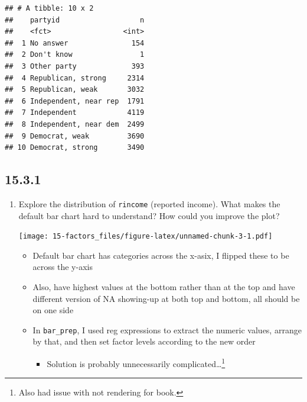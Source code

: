 \documentclass[]{book}
\newenvironment{Shaded}{\begin{snugshade}}{\end{snugshade}}
\newcommand{\DataTypeTok}[1]{\textcolor[rgb]{0.13,0.29,0.53}{#1}}
\newcommand{\KeywordTok}[1]{\textcolor[rgb]{0.13,0.29,0.53}{\textbf{#1}}}
\newcommand{\NormalTok}[1]{#1}
\newcommand{\OperatorTok}[1]{\textcolor[rgb]{0.81,0.36,0.00}{\textbf{#1}}}
\newcommand{\StringTok}[1]{\textcolor[rgb]{0.31,0.60,0.02}{#1}}
\providecommand{\tightlist}{%
  \setlength{\itemsep}{0pt}\setlength{\parskip}{0pt}}
\let\rmarkdownfootnote\footnote%
\def\footnote{\protect\rmarkdownfootnote}
\theoremstyle{definition}
\theoremstyle{definition}
\theoremstyle{definition}
\theoremstyle{remark}
\begin{document}
\begin{verbatim}
## # A tibble: 10 x 2
##    partyid                   n
##    <fct>                 <int>
##  1 No answer               154
##  2 Don't know                1
##  3 Other party             393
##  4 Republican, strong     2314
##  5 Republican, weak       3032
##  6 Independent, near rep  1791
##  7 Independent            4119
##  8 Independent, near dem  2499
##  9 Democrat, weak         3690
## 10 Democrat, strong       3490
\end{verbatim}

\hypertarget{section-53}{%
\subsection{15.3.1}\label{section-53}}

\begin{enumerate}
\def\labelenumi{\arabic{enumi}.}
\item
  Explore the distribution of \texttt{rincome} (reported income). What
  makes the default bar chart hard to understand? How could you improve
  the plot?

\begin{Shaded}
\end{Shaded}

  \texttt{[image: 15-factors\_files/figure-latex/unnamed-chunk-3-1.pdf]}

  \begin{itemize}
  \tightlist
  \item
    Default bar chart has categories across the x-asix, I flipped these
    to be across the y-axis
  \item
    Also, have highest values at the bottom rather than at the top and
    have different version of NA showing-up at both top and bottom, all
    should be on one side
  \item
    In \texttt{bar\_prep}, I used reg expressions to extract the numeric
    values, arrange by that, and then set factor levels according to the
    new order

    \begin{itemize}
    \tightlist
    \item
      Solution is probably unnecessarily complicated\ldots{}\footnote{Also
        had issue with not rendering for book.}
    \end{itemize}
  \end{itemize}


\end{enumerate}
\end{document}
